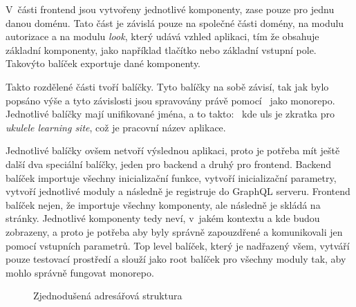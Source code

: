 V~části frontend jsou vytvořeny jednotlivé komponenty, zase pouze pro jednu danou doménu. Tato část je závislá pouze na společné části domény, na modulu autorizace a na modulu \emph{look}, který udává vzhled aplikaci, tím že obsahuje základní komponenty, jako například tlačítko nebo základní vstupní pole. Takovýto balíček exportuje dané komponenty.

Takto rozdělené části tvoří balíčky. Tyto balíčky na sobě závisí, tak jak bylo popsáno výše a tyto závislosti jsou spravovány právě pomocí~ jako monorepo. Jednotlivé balíčky mají unifikované jména, a to takto:~ kde uls je zkratka pro \emph{ukulele learning site}, což je pracovní název aplikace.

Jednotlivé balíčky ovšem netvoří výslednou aplikaci, proto je potřeba mít ještě další dva speciální balíčky, jeden pro backend a druhý pro frontend. Backend balíček importuje všechny inicializační funkce, vytvoří inicializační parametry, vytvoří jednotlivé moduly a následně je registruje do GraphQL serveru. Frontend balíček nejen, že importuje všechny komponenty, ale následně je skládá na stránky. Jednotlivé komponenty tedy neví, v~jakém kontextu a kde budou zobrazeny, a proto je potřeba aby byly správně zapouzdřené a komunikovali jen pomocí vstupních parametrů. Top level balíček, který je nadřazený všem, vytváří pouze testovací prostředí a slouží jako root balíček pro všechny moduly tak, aby mohlo správně fungovat monorepo.


\begin{figure}
    \caption{Zjednodušená adresářová struktura}
    \label{fig:modules}
\end{figure}

